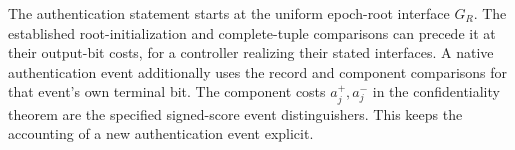 The authentication statement starts at the uniform epoch-root interface
$G_R$. The established root-initialization and complete-tuple comparisons
can precede it at their output-bit costs, for a controller realizing their
stated interfaces. A native authentication event additionally uses the
record and component comparisons for that event's own terminal bit.
The component costs $a_j^+,a_j^-$ in the confidentiality theorem are the
specified signed-score event distinguishers. This keeps the accounting
of a new authentication event explicit.
